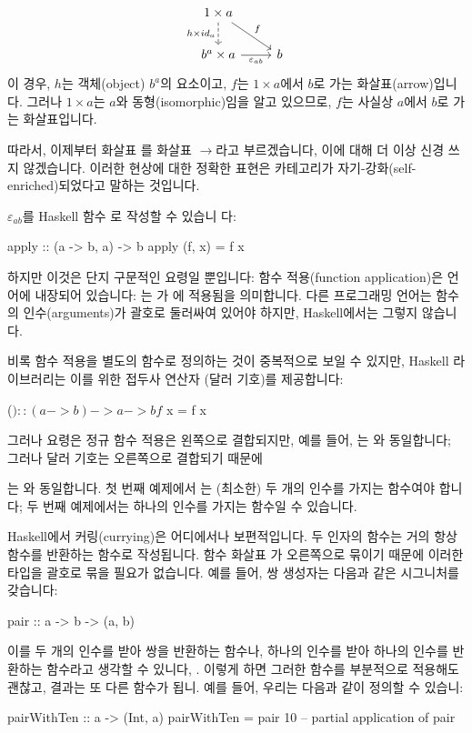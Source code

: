 \documentclass[DaoFP]{subfiles}
\begin{document}
\[
 \begin{tikzcd}
 1 \times a
 \arrow[d, dashed, "h \times id_a"']
 \arrow[rd, "f"]
 \\
 b^a \times a
 \arrow[r, "\varepsilon_{a b}"']
& b
 \end{tikzcd}
\]
이 경우, $h$는 객체(object) $b^a$의 요소이고, $f$는 $1 \times a$에서 $b$로 가는 화살표(arrow)입니다. 그러나 $1 \times a$는 $a$와 동형(isomorphic)임을 알고 있으므로, $f$는 사실상 $a$에서 $b$로 가는 화살표입니다.

따라서, 이제부터 화살표 \hask{->}를 화살표 $\to$라고 부르겠습니다, 이에 대해 더 이상 신경 쓰지 않겠습니다. 이러한 현상에 대한 정확한 표현은 카테고리가 자기-강화(self-enriched)되었다고 말하는 것입니다.

$\varepsilon_{a b}$를 Haskell 함수 로 작성할 수 있습니 다:
\begin{haskell}
apply :: (a -> b, a) -> b
apply (f, x) = f x
\end{haskell}
하지만 이것은 단지 구문적인 요령일 뿐입니다: 함수 적용(function application)은 언어에 내장되어 있습니다: 는 가 에 적용됨을 의미합니다. 다른 프로그래밍 언어는 함수의 인수(arguments)가 괄호로 둘러싸여 있어야 하지만, Haskell에서는 그렇지 않습니다.

비록 함수 적용을 별도의 함수로 정의하는 것이 중복적으로 보일 수 있지만, Haskell 라이브러리는 이를 위한 접두사 연산자 \hask{$}(달러 기호)를 제공합니다:
\begin{haskell}
($) :: (a -> b) -> a -> b
f $ x = f x
\end{haskell}
그러나 요령은 정규 함수 적용은 왼쪽으로 결합되지만, 예를 들어, 는 와 동일합니다; 그러나 달러 기호는 오른쪽으로 결합되기 때문에
는 와 동일합니다. 첫 번째 예제에서 는 (최소한) 두 개의 인수를 가지는 함수여야 합니다; 두 번째 예제에서는 하나의 인수를 가지는 함수일 수 있습니다.

Haskell에서 커링(currying)은 어디에서나 보편적입니다. 두 인자의 함수는 거의 항상 함수를 반환하는 함수로 작성됩니다. 함수 화살표 \hask{->}가 오른쪽으로 묶이기 때문에 이러한 타입을 괄호로 묶을 필요가 없습니다. 예를 들어, 쌍 생성자는 다음과 같은 시그니처를 갖습니다:
\begin{haskell}
pair :: a -> b -> (a, b)
\end{haskell}
이를 두 개의 인수를 받아 쌍을 반환하는 함수나, 하나의 인수를 받아 하나의 인수를 반환하는 함수라고 생각할 수 있니다, . 이렇게 하면 그러한 함수를 부분적으로 적용해도 괜찮고, 결과는 또 다른 함수가 됩니. 예를 들어, 우리는 다음과 같이 정의할 수 있습니:
\begin{haskell}
pairWithTen :: a -> (Int, a)
pairWithTen = pair 10 -- partial application of pair
\end{haskell}
\end{document}
